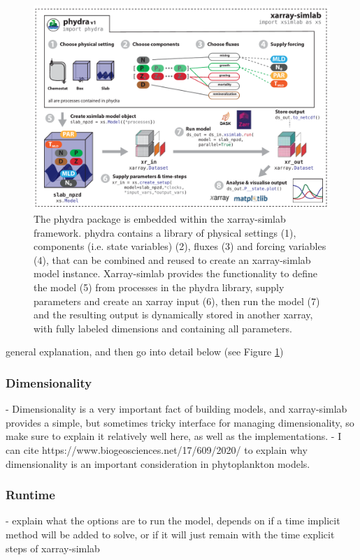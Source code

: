 \documentclass[template.tex]{subfiles}
\begin{document}
%
\begin{figure}[t]
\includegraphics[width=12cm]{Figures/firstdraft_schematics/01__schematics_phydra_1.pdf}
\caption{The phydra package is embedded within the xarray-simlab framework. phydra contains a library of physical settings (1), components (i.e. state variables) (2), fluxes (3) and forcing variables (4), that can be combined and reused to create an xarray-simlab model instance. Xarray-simlab provides the functionality to define the model (5) from processes in the phydra library, supply parameters and create an xarray input (6), then run the model (7) and the resulting output is dynamically stored in another xarray, with fully labeled dimensions and containing all parameters.}
\label{Figure:phydraschematics}
\end{figure}

general explanation, and then go into detail below (see Figure \ref{Figure:phydraschematics})

\subsubsection{Dimensionality}
- Dimensionality is a very important fact of building models, and xarray-simlab provides a simple, but sometimes tricky interface for managing dimensionality, so make sure to explain it relatively well here, as well as the implementations.
- I can cite https://www.biogeosciences.net/17/609/2020/ to explain why dimensionality is an important consideration in phytoplankton models.

\subsubsection{Runtime}
- explain what the options are to run the model, depends on if a time implicit method will be added to solve, or if it will just remain with the time explicit steps of xarray-simlab
\end{document}
